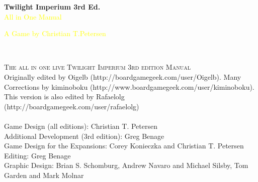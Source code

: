 \documentclass[11pt,fleqn]{book} %
\begin{document}

\begingroup
\thispagestyle{empty}
\centering
\vspace*{10cm}
\par\normalfont\fontsize{1}{1}\sffamily\selectfont
\textbf{Twilight Imperium 3rd Ed.}\\
{\LARGE\textcolor{yellow}{All in One Manual}}\par %
\vspace*{1cm}
{\Huge\textcolor{yellow}{ A Game by Christian T.Petersen}}\par %
\endgroup

\newpage
~\vfill
\thispagestyle{empty}


\noindent \textsc{The all in one live Twilight Imperium 3rd edition Manual}\\




\noindent Originally edited by Oigelb (http://boardgamegeek.com/user/Oigelb).
Many Corrections by kiminoboku (http://www.boardgamegeek.com/user/kiminoboku).\\ 
This version is also edited by Rafaelolg (http://boardgamegeek.com/user/rafaelolg)\\
\\

\noindent Game Design (all editions): Christian T. Petersen\\
Additional Development (3rd edition): Greg Benage\\
Game Design for the Expansions: Corey Konieczka and Christian T. Petersen\\
Editing: Greg Benage\\
Graphic Design: Brian S. Schomburg, Andrew Navaro and Michael Silsby, Tom Garden and Mark Molnar\\
\end{document}
